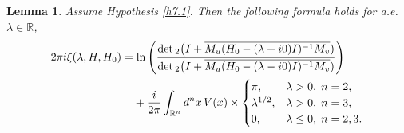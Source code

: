 \documentclass[reqno,10pt, centertags]{amsart}
\newcommand{\bbR}{{\mathbb{R}}}
\newcommand{\lb}{\label}
\newcommand{\ol}{\overline}
\newcommand{\la}{\lambda}
\renewcommand{\ln}{\text{\rm ln}}
\numberwithin{equation}{section}
\newtheorem{lemma}[theorem]{Lemma}
\theoremstyle{definition}
\begin{document}
\begin{lemma} \lb{l7.4}
Assume Hypothesis \ref{h7.1}. Then the following formula holds for a.e.\
$\lambda\in\bbR$,
\begin{align}
\begin{split}
2\pi i\xi(\la,H,H_0) =& \; \ln\left(
\frac{\det{}_2\big(I+\ol{M_u(H_0-(\la+i0)I)^{-1}M_v})}
{\det{}_2\big(I+\ol{M_u(H_0-(\la-i0)I)^{-1}M_v})} \right) \lb{7.11}
\\
&+ \frac{i}{2\pi}\int_{\bbR^n} d^nx\,V(x) \times \begin{cases} \pi,
& \la>0, \; n=2,\\
\la^{1/2}, & \la>0, \; n=3,\\
0, & \la\leq0, \; n=2,3.
\end{cases}
\end{split}
\end{align}
\end{lemma}
\end{document}
